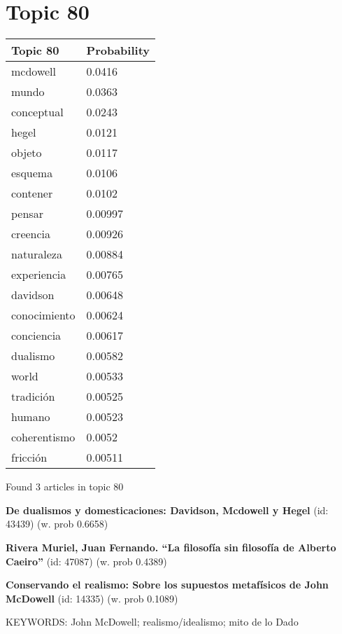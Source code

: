 \documentclass{article}
\begin{document}
\centering
\thispagestyle{empty}
\section*{Topic 80}\vfill
\begin{tabular}{ll}
\toprule
     Topic 80 & Probability \\
\midrule
     mcdowell &      0.0416 \\
        mundo &      0.0363 \\
   conceptual &      0.0243 \\
        hegel &      0.0121 \\
       objeto &      0.0117 \\
      esquema &      0.0106 \\
     contener &      0.0102 \\
       pensar &     0.00997 \\
     creencia &     0.00926 \\
   naturaleza &     0.00884 \\
  experiencia &     0.00765 \\
     davidson &     0.00648 \\
 conocimiento &     0.00624 \\
   conciencia &     0.00617 \\
     dualismo &     0.00582 \\
        world &     0.00533 \\
    tradición &     0.00525 \\
       humano &     0.00523 \\
 coherentismo &      0.0052 \\
     fricción &     0.00511 \\
\bottomrule
\end{tabular}

\vfill
Found 3 articles in topic 80
\vfill

\textbf{De dualismos y  domesticaciones:  Davidson, Mcdowell y Hegel} (id: 43439)
 (w. prob 0.6658)
\vfill

\textbf{Rivera Muriel, Juan Fernando. “La filosofía sin filosofía de Alberto Caeiro”} (id: 47087)
 (w. prob 0.4389)
\vfill

\textbf{Conservando el realismo: Sobre los supuestos metafísicos de John McDowell} (id: 14335)
 (w. prob 0.1089)


KEYWORDS:
John McDowell; realismo/idealismo; mito de lo Dado

\vfill
\newpage
\end{document}
